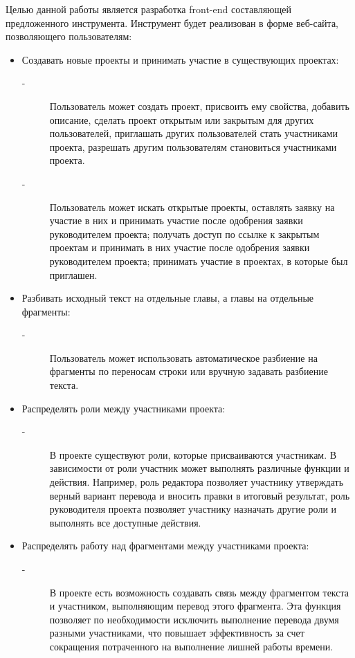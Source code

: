 \documentclass[a4paper,12pt]{article}
\begin{document}
Целью данной работы является разработка front-end составляющей предложенного инструмента. Инструмент будет реализован в форме веб-сайта, позволяющего пользователям:
\begin{itemize}
	\item Создавать новые проекты и принимать участие в существующих проектах:
	\begin{description}
		\item[-] Пользователь может создать проект, присвоить ему свойства, добавить описание, сделать проект открытым или закрытым для других пользователей, приглашать других пользователей стать участниками проекта, разрешать другим пользователям становиться участниками проекта.
		\item[-] Пользователь может искать открытые проекты, оставлять заявку на участие в них и принимать участие после одобрения заявки руководителем проекта; получать доступ по ссылке к закрытым проектам и принимать в них участие после одобрения заявки руководителем проекта; принимать участие в проектах, в которые был приглашен.
	\end{description}
	\item Разбивать исходный текст на отдельные главы, а главы на отдельные фрагменты:
	\begin{description}
		\item[-] Пользователь может использовать автоматическое разбиение на фрагменты по переносам строки или вручную задавать разбиение текста.
	\end{description}
	\item Распределять роли между участниками проекта:
	\begin{description}
		\item[-] В проекте существуют роли, которые присваиваются участникам. В зависимости от роли участник может выполнять различные функции и действия. Например, роль редактора позволяет участнику утверждать верный вариант перевода и вносить правки в итоговый результат, роль руководителя проекта позволяет участнику назначать другие роли и выполнять все доступные действия.
	\end{description}
	\item Распределять работу над фрагментами между участниками проекта:
	\begin{description}
		\item[-] В проекте есть возможность создавать связь между фрагментом текста и участником, выполняющим перевод этого фрагмента. Эта функция позволяет по необходимости исключить выполнение перевода двумя разными участниками, что повышает эффективность за счет сокращения потраченного на выполнение лишней работы времени.

\end{description}
\end{itemize}
\end{document}
